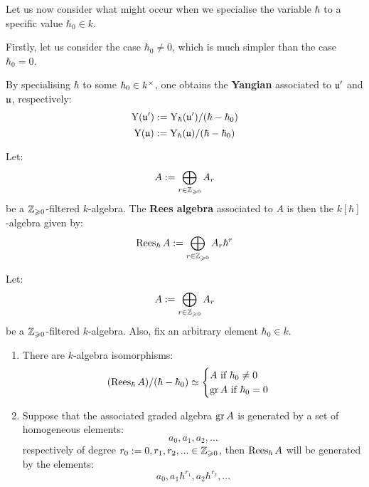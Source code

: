         Let us now consider what might occur when we specialise the variable $\hbar$ to a specific value $\hbar_0 \in k$.

        Firstly, let us consider the case $\hbar_0 \not = 0$, which is much simpler than the case $\hbar_0 = 0$. 
        \begin{definition} \label{def: yangians_associated_to_symmetrisable_kac_moody_algebras}
            By specialising $\hbar$ to some $\hbar_0 \in k^{\x}$, one obtains the \textbf{Yangian} associated to $\mathfrak{u}'$ and $\mathfrak{u}$, respectively:
                $$\mathrm{Y}(\mathfrak{u}') := \mathrm{Y}_{\hbar}(\mathfrak{u}')/(\hbar - \hbar_0)$$
                $$\mathrm{Y}(\mathfrak{u}) := \mathrm{Y}_{\hbar}(\mathfrak{u})/(\hbar - \hbar_0)$$
        \end{definition}
        \begin{definition} \label{def: rees_algebras}
            Let:
                $$A := \bigoplus_{r \in \mathbb{Z}_{\geqslant 0}} A_r$$
            be a $\mathbb{Z}_{\geqslant 0}$-filtered $k$-algebra. The \textbf{Rees algebra} associated to $A$ is then the $k[\hbar]$-algebra given by:
                $$\operatorname{Rees}_{\hbar} A := \bigoplus_{r \in \mathbb{Z}_{\geqslant 0}} A_r \hbar^r$$
        \end{definition}
        \begin{lemma} \label{lemma: basic_properties_of_rees_algebras}
            \cite[Exercise I.9.5]{kassel_quantum_groups} Let:
                $$A := \bigoplus_{r \in \mathbb{Z}_{\geqslant 0}} A_r$$
            be a $\mathbb{Z}_{\geqslant 0}$-filtered $k$-algebra. Also, fix an arbitrary element $\hbar_0 \in k$.
            \begin{enumerate}
                \item There are $k$-algebra isomorphisms:
                    $$
                        (\operatorname{Rees}_{\hbar} A)/(\hbar - \hbar_0) \simeq
                        \begin{cases}
                            \text{$A$ if $\hbar_0 \not = 0$}
                            \\
                            \text{$\operatorname{gr} A$ if $\hbar_0 = 0$}
                        \end{cases}
                    $$
                \item Suppose that the associated graded algebra $\operatorname{gr} A$ is generated by a set of homogeneous elements:
                    $$a_0, a_1, a_2, ...$$
                respectively of degree $r_0 := 0, r_1, r_2, ... \in \mathbb{Z}_{\geqslant 0}$, then $\operatorname{Rees}_{\hbar} A$ will be generated by the elements:
                    $$a_0, a_1 \hbar^{r_1}, a_2 \hbar^{r_2}, ...$$
            \end{enumerate}
        \end{lemma}

